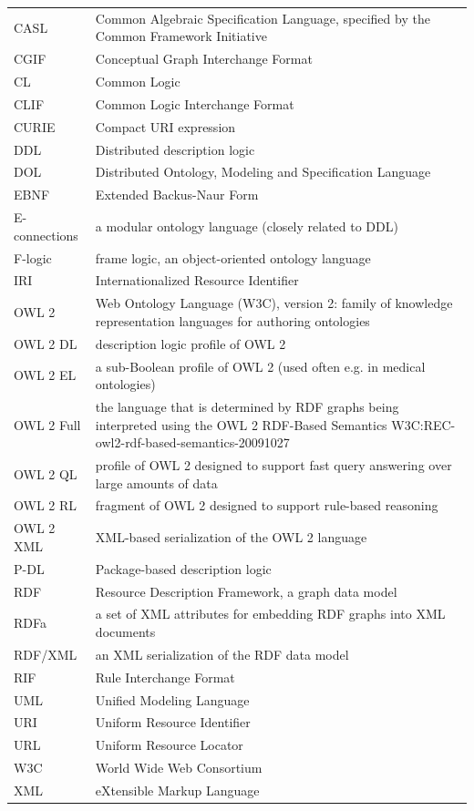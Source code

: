 \documentclass[10pt,%
\ifpretendfinal
final%
\else
draft%
\fi,
]{scrreprt}
\makeatletter
\newcommand*{\eg}{e.g.\@\xspace}
\newcommand{\bref}[1]{[\ref{#1}]}
\newenvironment{symbols}[0]{\begin{longtable}{p{.15\textwidth}p{.84\textwidth}}}{\end{longtable}}
\newcommand{\symboldef}[2]{ #1 & #2 \\}
\renewcommand{\bref}[1]{#1}
\makeatother
\begin{document}
\begin{symbols}
\symboldef{CASL}{Common Algebraic Specification Language, specified by the Common Framework Initiative}
\symboldef{CGIF}{Conceptual Graph Interchange Format}
\symboldef{CL}{Common Logic }
\symboldef{CLIF}{Common Logic Interchange Format}
\symboldef{CURIE}{Compact URI expression}
\symboldef{DDL}{Distributed description logic}
\symboldef{DOL}{Distributed Ontology, Modeling and Specification Language }
\symboldef{EBNF}{Extended Backus-Naur Form}
\symboldef{E-connections}{a modular ontology language (closely related to DDL)}
\symboldef{F-logic}{frame logic, an object-oriented ontology language}
\symboldef{IRI}{Internationalized Resource Identifier}
\symboldef{OWL 2}{Web Ontology Language (W3C), version 2: family of knowledge representation languages for authoring ontologies}
\symboldef{OWL 2 DL}{description logic profile of OWL 2}
\symboldef{OWL 2 EL}{a sub-Boolean profile of OWL 2 (used often \eg in medical ontologies)}
\symboldef{OWL 2 Full}{the language that is determined by RDF graphs being interpreted using the OWL 2 RDF-Based Semantics \bref{W3C:REC-owl2-rdf-based-semantics-20091027}}
\symboldef{OWL 2 QL}{profile of OWL 2 designed to support fast query answering over large amounts of data}
\symboldef{OWL 2 RL}{fragment of OWL 2 designed to support rule-based reasoning}
\symboldef{OWL 2 XML}{XML-based serialization of the OWL 2 language}
\symboldef{P-DL}{Package-based description logic}
\symboldef{RDF}{Resource Description Framework, a graph data model}
\symboldef{RDFa}{a set of XML attributes for embedding RDF graphs into XML documents}
\symboldef{RDF/XML}{an XML serialization of the RDF data model}
\symboldef{RIF}{Rule Interchange Format}
\symboldef{UML}{Unified Modeling Language}
\symboldef{URI}{Uniform Resource Identifier}
\symboldef{URL}{Uniform Resource Locator}
\symboldef{W3C}{World Wide Web Consortium}
\symboldef{XML}{eXtensible Markup Language}
\end{symbols}
\end{document}
